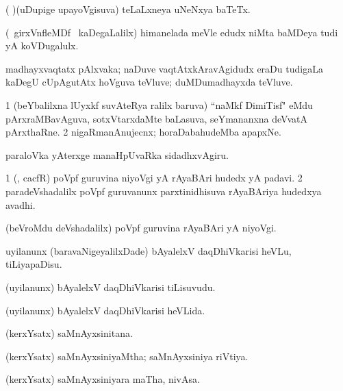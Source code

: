 \noindent
\gl{\pagu}
\bmng
{} ( )(uDupige upayoVgisuva) teLaLxneya uNeNxya baTeTx. 
\emng
\eentry

\bentry
{}
\gl{\nA}
\bmng
(\kanmu\ girxVnfleMDf \mo\ kaDegaLalilx) himanelada meVle edudx niMta baMDeya tudi yA koVDugalulx. 
\emng
\eentry

\bentry
{}
\gl{\nA}
\bmng
madhayxvaqtatx pAlxvaka; naDuve vaqtAtxkAravAgidudx eraDu tudigaLa kaDegU cUpAgutAtx hoVguva teVluve; duMDumadhayxda teVluve. 
\emng
\eentry

\bentry
{}
\gl{\nA}
\expl{\Latin}
\bmng
\bnum
\num{1} (beYbalilxna lUyxkf suvAteRya ralilx baruva) ``naMkf DimiTisf" eMdu pArxraMBavAguva, sotxVtarxdaMte baLasuva, seYmananxna deVvatA pArxthaRne. 
\num{2} nigaRmanAnujecnx; horaDabahudeMba apapxNe. 
\enum
\emng

\noindent
\gl{\pagu}
\bmng
{} paraloVka yAterxge manaHpUvaRka sidadhxvAgiru. 
\emng
\eentry

\bentry
{}
\gl{\nA}
\bmng
\bnum
\num{1} (\roVkAyx, cacfR) poVpf guruvina niyoVgi yA rAyaBAri hudedx yA padavi. 
\num{2} paradeVshadalilx poVpf guruvanunx parxtinidhisuva rAyaBAriya hudedxya avadhi. 
\enum
\emng
\eentry

\bentry
{}
\gl{\nA}
\bmng
(beVroMdu deVshadalilx) poVpf guruvina rAyaBAri yA niyoVgi. 
\emng
\eentry

\bentry
{}
\gl{\sakirx}
\bmng
uyilanunx (baravaNigeyalilxDade) bAyalelxV daqDhiVkarisi heVLu, tiLiyapaDisu. 
\emng
\eentry

\bentry
{}
\gl{\nA}
\bmng
(uyilanunx) bAyalelxV daqDhiVkarisi tiLisuvudu. 
\emng
\eentry

\bentry
{}
\gl{\gu}
\bmng
(uyilanunx) bAyalelxV daqDhiVkarisi heVLida. 
\emng
\eentry

\bentry
{}
\gl{\nA}
\bmng
(kerxYsatx) saMnAyxsinitana. 
\emng
\eentry

\bentry
{}
\gl{\gu}
\bmng
(kerxYsatx) saMnAyxsiniyaMtha; saMnAyxsiniya riVtiya. 
\emng
\eentry

\bentry
{}
\gl{\nA}
\bmng
(kerxYsatx) saMnAyxsiniyara maTha, nivAsa. 
\emng
\eentry


